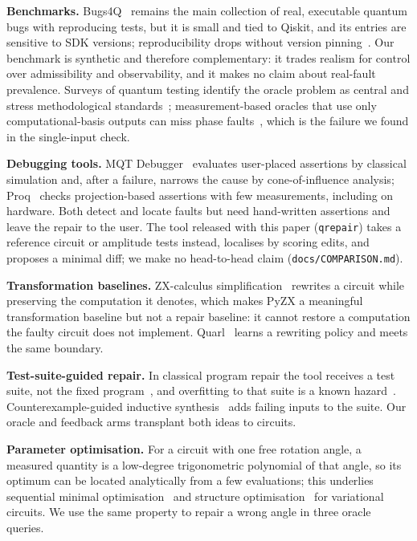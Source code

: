 \documentclass[journal]{IEEEtran}
\begin{document}
\textbf{Benchmarks.} Bugs4Q~\cite{zhao2023bugs4q} remains the main collection of
real, executable quantum bugs with reproducing tests, but it is small and tied to
Qiskit, and its entries are sensitive to SDK versions; reproducibility drops
without version pinning~\cite{ohto2026reproducibility}. Our benchmark is
synthetic and therefore complementary: it trades realism for control over
admissibility and observability, and it makes no claim about real-fault
prevalence. Surveys of quantum testing identify the oracle problem as central
and stress methodological standards~\cite{ramalho2024roadmap}; measurement-based
oracles that use only computational-basis outputs can miss phase
faults~\cite{oldfield2024projective}, which is the failure we found in the
single-input check.

\textbf{Debugging tools.} MQT Debugger~\cite{rovara2025debugging} evaluates
user-placed assertions by classical simulation and, after a failure, narrows the
cause by cone-of-influence analysis; Proq~\cite{li2020proq} checks
projection-based assertions with few measurements, including on hardware. Both
detect and locate faults but need hand-written assertions and leave the repair
to the user. The tool released with this paper (\texttt{qrepair}) takes a
reference circuit or amplitude tests instead, localises by scoring edits, and
proposes a minimal diff; we make no head-to-head claim (\texttt{docs/COMPARISON.md}).

\textbf{Transformation baselines.} ZX-calculus simplification~\cite{duncan2020zx}
rewrites a circuit while preserving the computation it denotes, which makes PyZX
a meaningful transformation baseline but not a repair baseline: it cannot restore
a computation the faulty circuit does not implement. Quarl~\cite{li2024quarl}
learns a rewriting policy and meets the same boundary.

\textbf{Test-suite-guided repair.} In classical program repair the tool receives
a test suite, not the fixed program~\cite{legoues2012genprog}, and overfitting to
that suite is a known hazard~\cite{smith2015overfitting}. Counterexample-guided
inductive synthesis~\cite{solarlezama2006sketching} adds failing inputs to the
suite. Our oracle and feedback arms transplant both ideas to circuits.

\textbf{Parameter optimisation.} For a circuit with one free rotation angle, a
measured quantity is a low-degree trigonometric polynomial of that angle, so its
optimum can be located analytically from a few evaluations; this underlies
sequential minimal optimisation~\cite{nakanishi2020sequential} and structure
optimisation~\cite{ostaszewski2021structure} for variational circuits. We use the
same property to repair a wrong angle in three oracle queries.
\end{document}
